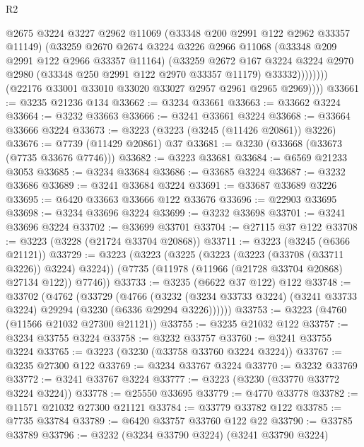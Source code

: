 \begin{lexlean}{R2}
\begin{coremodule}
                      @2675
                      @3224
                      @3227
                      @2962
                      @11069
                      (@33348 @200 @2991 @122 @2962 @33357 @11149)
                      (@33259
                        @2670
                        @2674
                        @3224
                        @3226
                        @2966
                        @11068
                        (@33348 @209 @2991 @122 @2966 @33357 @11164)
                        (@33259
                          @2672
                          @167
                          @3224
                          @3224
                          @2970
                          @2980
                          (@33348 @250 @2991 @122 @2970 @33357 @11179)
                          @33332))))))))
          (@22176 @33001 @33010 @33020 @33027 @2957 @2961 @2965 @2969))))
@33661 := @3235 @21236 @134
@33662 := @3234 @33661
@33663 := @33662 @3224
@33664 := @3232 @33663
@33666 := @3241 @33661 @3224
@33668 := @33664 @33666 @3224
@33673 := @3223 (@3223 (@3245 (@11426 @20861)) @3226)
@33676 := @7739 (@11429 @20861) @37
@33681 := @3230 (@33668 (@33673 (@7735 @33676 @7746)))
@33682 := @3223 @33681
@33684 := @6569 @21233 @3053
@33685 := @3234 @33684
@33686 := @33685 @3224
@33687 := @3232 @33686
@33689 := @3241 @33684 @3224
@33691 := @33687 @33689 @3226
@33695 := @6420 @33663 @33666 @122 @33676
@33696 := @22903 @33695
@33698 := @3234 @33696 @3224
@33699 := @3232 @33698
@33701 := @3241 @33696 @3224
@33702 := @33699 @33701
@33704 := @27115 @37 @122
@33708 := @3223 (@3228 (@21724 @33704 @20868))
@33711 := @3223 (@3245 (@6366 @21121))
@33729 := @3223
    (@3223
      (@3225 (@3223 (@3223 (@33708 (@33711 @3226)) @3224) @3224))
      (@7735 (@11978 (@11966 (@21728 @33704 @20868) @27134 @122)) @7746))
@33733 := @3235 (@6622 @37 @122) @122
@33748 := @33702
    (@4762
      (@33729
        (@4766
          (@3232 (@3234 @33733 @3224) (@3241 @33733 @3224) @29294 (@3230 (@6336 @29294 @3226))))))
@33753 := @3223 (@4760 (@11566 @21032 @27300 @21121))
@33755 := @3235 @21032 @122
@33757 := @3234 @33755 @3224
@33758 := @3232 @33757
@33760 := @3241 @33755 @3224
@33765 := @3223 (@3230 (@33758 @33760 @3224 @3224))
@33767 := @3235 @27300 @122
@33769 := @3234 @33767 @3224
@33770 := @3232 @33769
@33772 := @3241 @33767 @3224
@33777 := @3223 (@3230 (@33770 @33772 @3224 @3224))
@33778 := @25550 @33695
@33779 := @4770 @33778
@33782 := @11571 @21032 @27300 @21121
@33784 := @33779 @33782 @122
@33785 := @7735 @33784
@33789 := @6420 @33757 @33760 @122 @22
@33790 := @33785 @33789
@33796 := @3232 (@3234 @33790 @3224) (@3241 @33790 @3224)

\end{coremodule}
\end{lexlean}
